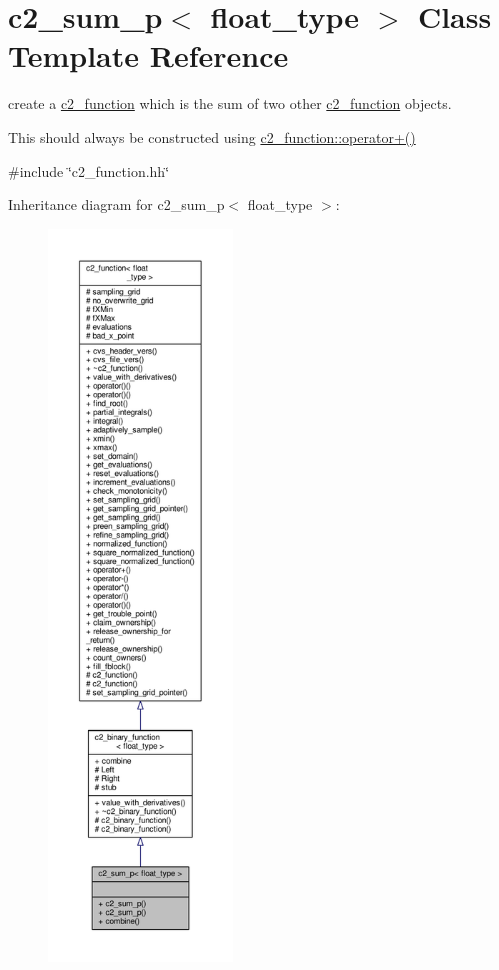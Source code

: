 \hypertarget{classc2__sum__p}{}\section{c2\+\_\+sum\+\_\+p$<$ float\+\_\+type $>$ Class Template Reference}
\label{classc2__sum__p}


create a \hyperlink{classc2__function}{c2\+\_\+function} which is the sum of two other \hyperlink{classc2__function}{c2\+\_\+function} objects.

This should always be constructed using \hyperlink{classc2__function_a268b206b47c55e635e5f0a9e0f3e8ded}{c2\+\_\+function\+::operator+()}  




{\ttfamily \#include \char`\"{}c2\+\_\+function.\+hh\char`\"{}}



Inheritance diagram for c2\+\_\+sum\+\_\+p$<$ float\+\_\+type $>$\+:
\nopagebreak
\begin{figure}[H]
\begin{center}
\leavevmode
\includegraphics[height=550pt]{classc2__sum__p__inherit__graph}
\end{center}
\end{figure}


